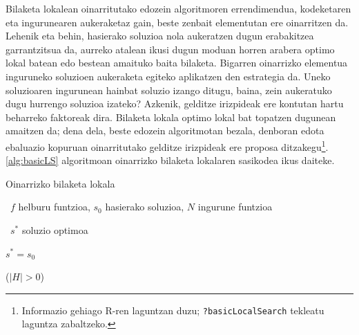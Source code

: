 \documentclass[eu]{ifirak}\usepackage[]{graphicx}\usepackage[]{color}
\newcommand{\code}[1]{\texttt{#1}}
\begin{document}
Bilaketa lokalean oinarritutako edozein algoritmoren errendimendua, kodeketaren eta ingurunearen aukeraketaz gain, beste zenbait elementutan ere oinarritzen da. Lehenik eta behin, hasierako soluzioa nola aukeratzen dugun erabakitzea garrantzitsua da, aurreko atalean ikusi dugun moduan horren arabera optimo lokal batean edo bestean amaituko baita bilaketa. Bigarren oinarrizko elementua inguruneko soluzioen aukeraketa egiteko aplikatzen den estrategia da. Uneko soluzioaren ingurunean hainbat soluzio izango ditugu, baina, zein aukeratuko dugu hurrengo soluzioa izateko? Azkenik, gelditze irizpideak ere kontutan hartu beharreko faktoreak dira. Bilaketa lokala optimo lokal bat topatzen dugunean amaitzen da; dena dela, beste edozein algoritmotan bezala, denboran edota ebaluazio kopuruan oinarritutako gelditze irizpideak ere proposa ditzakegu\footnote{Informazio gehiago R-ren laguntzan duzu; \code{?basicLocalSearch} tekleatu laguntza zabaltzeko.}. \ref{alg:basicLS} algoritmoan oinarrizko bilaketa lokalaren sasikodea ikus daiteke.

\begin{ifalgorithm}[t]\label{alg:basicLS}
\begin{ifpseudo}{Oinarrizko bilaketa lokala}
\item \In\ $f$ helburu funtzioa, $s_0$ hasierako soluzioa, $N$ ingurune funtzioa
\item \Out\ $s^*$ soluzio optimoa
\item $s^*=s_0$
\item \Do
\item {}
\item {}
\item {}
\item {}
\item \T{\EIf}
\item \While ($|H|>0$)
\end{ifpseudo}
\caption{Oinarrizko bilaketa lokalaren sasikodea. Uneko soluzioaren ingurunean fitness-a hobetzen duen soluzio bat bilatzen dugu. Horrelakorik badago, uneko soluzioa ordezkatzen dugu; ez badago, bilaketa amaitzen da.}
\end{ifalgorithm}
\end{document}
